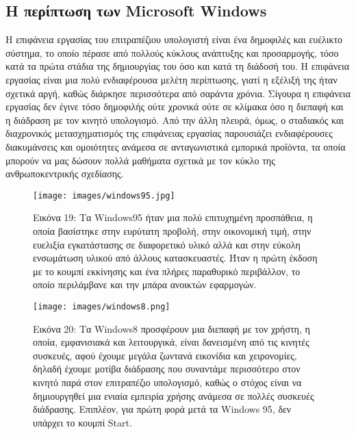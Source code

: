 \documentclass[
]{article}
\begin{document}
\hypertarget{ux3b7-ux3c0ux3b5ux3c1ux3afux3c0ux3c4ux3c9ux3c3ux3b7-ux3c4ux3c9ux3bd-microsoft-windows}{%
\subsection{Η περίπτωση των Microsoft
Windows}\label{ux3b7-ux3c0ux3b5ux3c1ux3afux3c0ux3c4ux3c9ux3c3ux3b7-ux3c4ux3c9ux3bd-microsoft-windows}}

Η επιφάνεια εργασίας του επιτραπέζιου υπολογιστή είναι ένα δημοφιλές και
ευέλικτο σύστημα, το οποίο πέρασε από πολλούς κύκλους ανάπτυξης και
προσαρμογής, τόσο κατά τα πρώτα στάδια της δημιουργίας του όσο και κατά
τη διάδοσή του. Η επιφάνεια εργασίας είναι μια πολύ ενδιαφέρουσα μελέτη
περίπτωσης, γιατί η εξέλιξή της ήταν σχετικά αργή, καθώς διάρκησε
περισσότερα από σαράντα χρόνια. Σίγουρα η επιφάνεια εργασίας δεν έγινε
τόσο δημοφιλής ούτε χρονικά ούτε σε κλίμακα όσο η διεπαφή και η διάδραση
με τον κινητό υπολογισμό. Από την άλλη πλευρά, όμως, ο σταδιακός και
διαχρονικός μετασχηματισμός της επιφάνειας εργασίας παρουσιάζει
ενδιαφέρουσες διακυμάνσεις και ομοιότητες ανάμεσα σε ανταγωνιστικά
εμπορικά προϊόντα, τα οποία μπορούν να μας δώσουν πολλά μαθήματα σχετικά
με τον κύκλο της ανθρωποκεντρικής σχεδίασης.

\leavevmode{}%
\begin{figure}
\hypertarget{fig:windows95}{%
\centering
\texttt{[image: images/windows95.jpg]}
\caption{Εικόνα 19: Τα Windows95 ήταν μια πολύ επιτυχημένη προσπάθεια, η
οποία βασίστηκε στην ευρύτατη προβολή, στην οικονομική τιμή, στην
ευελιξία εγκατάστασης σε διαφορετικό υλικό αλλά και στην εύκολη
ενσωμάτωση υλικού από άλλους κατασκευαστές. Ήταν η πρώτη έκδοση με το
κουμπί εκκίνησης και ένα πλήρες παραθυρικό περιβάλλον, το οποίο
περιλάμβανε και την μπάρα ανοικτών εφαρμογών.}\label{fig:windows95}
}
\end{figure}

\leavevmode{}%
\begin{figure}
\hypertarget{fig:windows8}{%
\centering
\texttt{[image: images/windows8.png]}
\caption{Εικόνα 20: Τα Windows8 προσφέρουν μια διεπαφή με τον χρήστη, η
οποία, εμφανισιακά και λειτουργικά, είναι δανεισμένη από τις κινητές
συσκευές, αφού έχουμε μεγάλα ζωντανά εικονίδια και χειρονομίες, δηλαδή
έχουμε μοτίβα διάδρασης που συναντάμε περισσότερο στον κινητό παρά στον
επιτραπέζιο υπολογισμό, καθώς ο στόχος είναι να δημιουργηθεί μια ενιαία
εμπειρία χρήσης ανάμεσα σε πολλές συσκευές διάδρασης. Επιπλέον, για
πρώτη φορά μετά τα Windows 95, δεν υπάρχει το κουμπί
Start.}\label{fig:windows8}
}
\end{figure}
\end{document}
